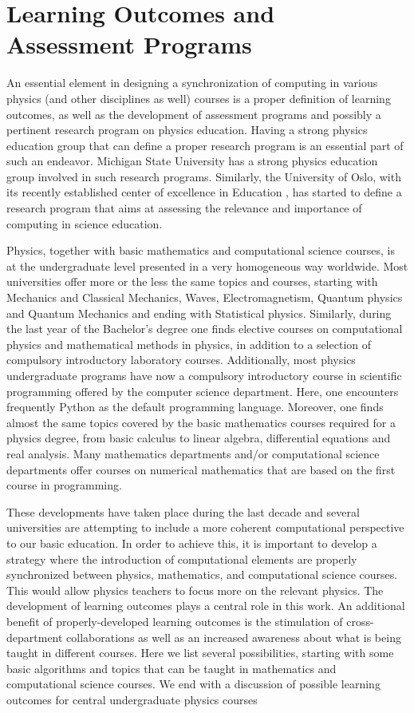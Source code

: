 \documentclass[graybox,envcountchap,sectrefs]{svmult}
\begin{document}
\section{Learning Outcomes and Assessment Programs}\label{sec:learingoutcomes}

An essential element in designing a synchronization of computing in
various physics (and other disciplines as well) courses is a proper
definition of learning outcomes, as well as the development of
assessment programs and possibly a pertinent research program on physics education.
Having a strong physics education
group that can define a proper research program is an essential part
of such an endeavor. Michigan State University has a strong physics
education group involved in such research programs. Similarly, the
University of Oslo, with its recently established center of excellence
in Education \cite{CCSEUiO}, has started to define  a research program that aims at assessing
the relevance and importance of
computing in science education.

Physics, together with basic mathematics and computational science
courses, is at the undergraduate level presented in a very homogeneous
way worldwide.  Most universities offer more or the less the same
topics and courses, starting with Mechanics and Classical Mechanics,
Waves, Electromagnetism, Quantum physics and Quantum Mechanics and
ending with Statistical physics. Similarly, during the last year of
the Bachelor's degree one finds elective courses on computational
physics and mathematical methods in physics, in addition to a
selection of compulsory introductory laboratory courses. Additionally, most physics undergraduate programs have now a compulsory
introductory course in scientific programming offered by the computer science department. Here, one encounters
frequently Python as the default programming language.  Moreover, one
finds almost the same topics covered by the basic mathematics courses
required for a physics degree, from basic calculus to linear algebra,
differential equations and real analysis. Many mathematics departments
and/or computational science departments offer courses on numerical
mathematics that are based on the first course in programming.

These developments have taken place during the last decade and several
universities are attempting to include a more coherent
computational perspective to our basic education. In order to achieve this, it is important to develop a
strategy where the introduction of computational elements are properly
synchronized between physics, mathematics, and computational science
courses. This would allow physics teachers to focus more on the relevant
physics. The development of learning outcomes plays a central role in this work.  An
additional benefit of properly-developed learning outcomes is the
stimulation of cross-department collaborations as well as an increased
awareness about what is being taught in different courses.  Here we
list several possibilities, starting with some basic algorithms and topics that
can be taught in mathematics and computational science courses. We end
with a discussion of possible learning outcomes for central
undergraduate physics courses
\end{document}
